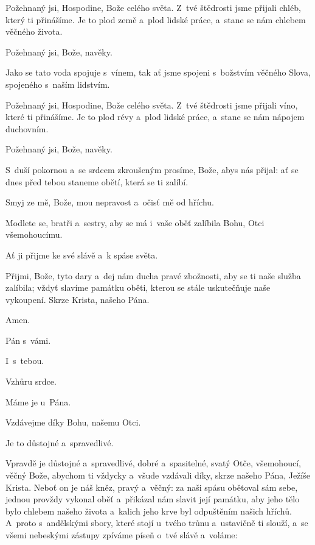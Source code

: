 \mbox{}

Požehnaný jsi, Hospodine, Bože celého světa. Z~tvé štědrosti jsme přijali chléb, který ti přinášíme. Je to plod země a~plod lidské práce, a~stane se nám chlebem věčného života.

\Rbardot{} Požehnaný jsi, Bože, navěky.

Jako se tato voda spojuje s~vínem, tak ať jsme spojeni s~božstvím věčného Slova, spojeného s~naším lidstvím.

Požehnaný jsi, Hospodine, Bože celého světa. Z~tvé štědrosti jsme přijali víno, které ti přinášíme. Je to plod révy a~plod lidské práce, a~stane se nám nápojem duchovním.

\Rbardot{} Požehnaný jsi, Bože, navěky.

\mbox{}

S~duší pokornou a~se srdcem zkroušeným prosíme, Bože, abys nás přijal: ať se dnes před tebou staneme obětí, která se ti zalíbí.

Smyj ze mě, Bože, mou nepravost a~očisť mě od hříchu.

\mbox{}

Modlete se, bratři a~sestry, aby se má i~vaše oběť zalíbila Bohu, Otci všemohoucímu.

\Rbardot{} Ať ji přijme ke své slávě a~k spáse světa.

\mbox{}

Přijmi, Bože, tyto dary a~dej nám ducha pravé zbožnosti, aby se ti naše služba zalíbila; vždyť slavíme památku oběti, kterou se stále uskutečňuje naše vykoupení. Skrze Krista, našeho Pána.

\Rbardot{} Amen.

\Vbardot{} Pán s~vámi.

\Rbardot{} I~s~tebou.

\Vbardot{} Vzhůru srdce.

\Rbardot{} Máme je u~Pána.

\Vbardot{} Vzdávejme díky Bohu, našemu Otci.

\Rbardot{} Je to důstojné a~spravedlivé.

\mbox{}

Vpravdě je důstojné a~spravedlivé, dobré a~spasitelné, svatý Otče, všemohoucí, věčný Bože, abychom ti vždycky a~všude vzdávali díky, skrze našeho Pána, Ježíše Krista. Neboť on je náš kněz, pravý a~věčný: za naši spásu obětoval sám sebe, jednou provždy vykonal oběť a~přikázal nám slavit její památku, aby jeho tělo bylo chlebem našeho života a~kalich jeho krve byl odpuštěním našich hříchů. A~proto s~andělskými sbory, které stojí u~tvého trůnu a~ustavičně ti slouží, a~se všemi nebeskými zástupy zpíváme píseň o~tvé slávě a~voláme:
